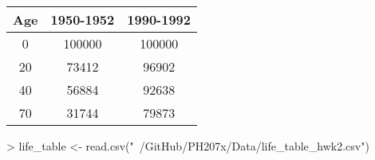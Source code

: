 \documentclass{article}
\begin{document}
\begin{table}[ht]
\begin{center}
\begin{tabular}{ccc}
  \hline
Age & 1950-1952 & 1990-1992 \\ 
  \hline
0  & 100000 & 100000 \\ 
20 & 73412 & 96902 \\ 
40 & 56884 & 92638 \\ 
70 & 31744 & 79873 \\ 
   \hline
\end{tabular}
\end{center}
\end{table}

\begin{Schunk}
\begin{Sinput}
> life_table <- read.csv("~/GitHub/PH207x/Data/life_table_hwk2.csv")
\end{Sinput}
\end{Schunk}
\end{document}

